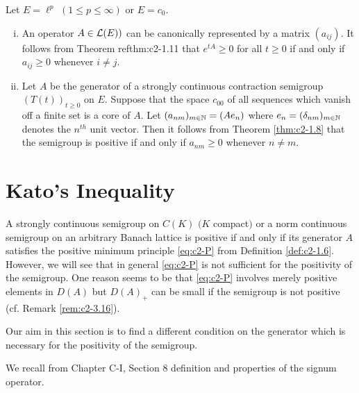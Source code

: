 \begin{examples}\label{ex:c2-1.13}
Let $E = \ell^p$ $(1 \leq p \leq \infty)$ or $E = c_{0}$.
\begin{enumerate}[(i), wide, labelsep=1em, itemindent=\parindent]
\item \label{ex:c2-1.13-1}
An operator $A \in \mathcal{L}(E))$ can be canonically represented by a matrix $(a_{ij})$.
It follows from Theorem ref{thm:c2-1.11} that $e^{tA} \geq 0$ for all $t \geq 0$ if and only if $a_{ij} \geq 0$ whenever $i \neq j$.
\item \label{ex:c2-1.13-2}
Let $A$ be the generator of a strongly continuous contraction semigroup $(T(t))_{t \geq 0}$ on $E$.
Suppose that the space $c_{00}$ of all sequences which vanish off a finite set is a core of $A$.
Let $(a_{nm})_{m \in \mathbb{N}} = (Ae_{n})$ where $e_{n} = (\delta_{nm})_{m \in \mathbb{N}}$ denotes the $n^{th}$ unit vector.
Then it follows from Theorem \ref{thm:c2-1.8}   that the semigroup is positive if and only if $a_{nm} \geq 0$ whenever $n \neq m$.
\end{enumerate}
\end{examples}

\section{Kato's Inequality} \label{sec:c2-2}

A strongly continuous semigroup on $C(K)$ $(K$ compact$)$ or a norm continuous semigroup on an arbitrary Banach lattice is positive if and only if its generator $A$ satisfies the positive minimum principle \ref{eq:c2-P} from Definition \ref{def:c2-1.6}.
However, we will see that in general \ref{eq:c2-P} is not sufficient for the positivity of the semigroup.
One reason seems to be that \ref{eq:c2-P} involves merely positive elements in $D(A)$ but $D(A)_{+}$ can be small if the semigroup is not positive (cf. Remark \ref{rem:c2-3.16}).

Our aim in this section is to find a different condition on the generator which is necessary for the positivity of the semigroup.

We recall from Chapter C-I, Section 8 
definition and properties of the signum operator.

